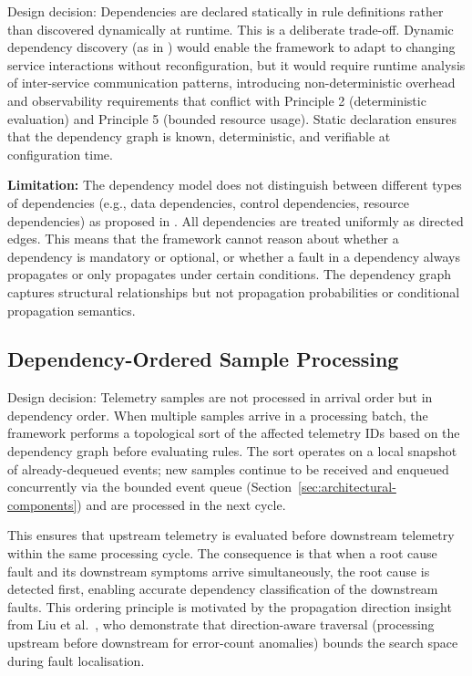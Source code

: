 Design decision: Dependencies are declared statically in rule definitions rather than discovered dynamically at runtime. This is a deliberate trade-off. Dynamic dependency discovery (as in \cite{ref11,ref27}) would enable the framework to adapt to changing service interactions without reconfiguration, but it would require runtime analysis of inter-service communication patterns, introducing non-deterministic overhead and observability requirements that conflict with Principle 2 (deterministic evaluation) and Principle 5 (bounded resource usage). Static declaration ensures that the dependency graph is known, deterministic, and verifiable at configuration time.

\textbf{Limitation:} The dependency model does not distinguish between different types of dependencies (e.g., data dependencies, control dependencies, resource dependencies) as proposed in \cite{ref10}. All dependencies are treated uniformly as directed edges. This means that the framework cannot reason about whether a dependency is mandatory or optional, or whether a fault in a dependency always propagates or only propagates under certain conditions. The dependency graph captures structural relationships but not propagation probabilities or conditional propagation semantics.

\subsection{Dependency-Ordered Sample Processing}\label{sec:dependency-ordered-processing}

Design decision: Telemetry samples are not processed in arrival order but in dependency order. When multiple samples arrive in a processing batch, the framework performs a topological sort of the affected telemetry IDs based on the dependency graph before evaluating rules. The sort operates on a local snapshot of already-dequeued events; new samples continue to be received and enqueued concurrently via the bounded event queue (Section~\ref{sec:architectural-components}) and are processed in the next cycle.

This ensures that upstream telemetry is evaluated before downstream telemetry within the same processing cycle. The consequence is that when a root cause fault and its downstream symptoms arrive simultaneously, the root cause is detected first, enabling accurate dependency classification of the downstream faults. This ordering principle is motivated by the propagation direction insight from Liu et al.\ \cite{ref27}, who demonstrate that direction-aware traversal (processing upstream before downstream for error-count anomalies) bounds the search space during fault localisation.

